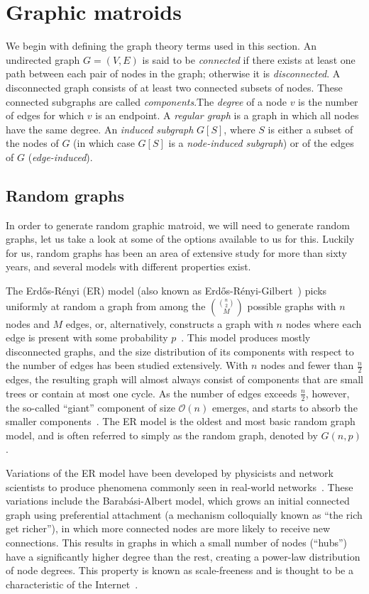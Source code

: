 \section{Graphic matroids}
We begin with defining the graph theory terms used in this section. An undirected graph $G=(V,E)$ is said to be \textit{connected} if there exists at least one path between each pair of nodes in the graph; otherwise it is \textit{disconnected}. A disconnected graph consists of at least two connected subsets of nodes. These connected subgraphs are called \textit{components}.The \textit{degree} of a node $v$ is the number of edges for which $v$ is an endpoint. A \textit{regular graph} is a graph in which all nodes have the same degree. An \textit{induced subgraph} $G[S]$, where $S$ is either a subset of the nodes of $G$ (in which case $G[S]$ is a \textit{node-induced subgraph}) or of the edges of $G$ (\textit{edge-induced}).

\subsection{Random graphs}
In order to generate random graphic matroid, we will need to generate random graphs, let us take a look at some of the options available to us for this. Luckily for us, random graphs has been an area of extensive study for more than sixty years, and several models with different properties exist.

The Erdős-Rényi (ER) model (also known as Erdős-Rényi-Gilbert~\cite{fienberg-2012}) picks uniformly at random a graph from among the $\binom{\binom{n}{2}}{M}$ possible graphs with $n$ nodes and $M$ edges, or, alternatively, constructs a graph with $n$ nodes where each edge is present with some probability $p$~\cite{erdos-1959, gilbert-1959}. This model produces mostly disconnected graphs, and the size distribution of its components with respect to the number of edges has been studied extensively. With $n$ nodes and fewer than $\frac{n}{2}$ edges, the resulting graph will almost always consist of components that are small trees or contain at most one cycle. As the number of edges exceeds $\frac{n}{2}$, however, the so-called ``giant'' component of size $\mathcal{O}(n)$ emerges, and starts to absorb the smaller components~\cite{janson1993birth}. The ER model is the oldest and most basic random graph model, and is often referred to simply as the random graph, denoted by $G(n,p)$.

Variations of the ER model have been developed by physicists and network scientists to produce phenomena commonly seen in real-world networks~\cite{fienberg-2012}. These variations include the Barabási-Albert model, which grows an initial connected graph using preferential attachment (a mechanism colloquially known as ``the rich get richer''), in which more connected nodes are more likely to receive new connections. This results in graphs in which a small number of nodes (``hubs'') have a significantly higher degree than the rest, creating a power-law distribution of node degrees. This property is known as scale-freeness and is thought to be a characteristic of the Internet~\cite{barabasi-albert}. 

